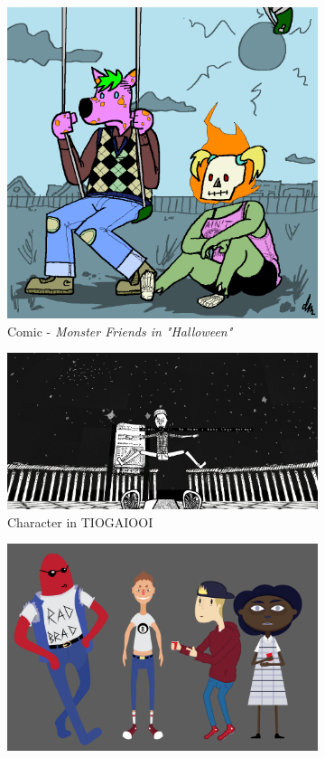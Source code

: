\begin{figure}[H]
\centering %
\begin{subfigure}{.3\textwidth}
\centering
\includegraphics[width=.9\linewidth]{images/ref_IAN01}
 	\caption{Comic - \textit{Monster Friends in "Halloween"}}
\label{fig:i1}
\end{subfigure} %
\begin{subfigure}{.59\textwidth}
\centering
\includegraphics[width=.9\linewidth]{images/ref_MICHAEL03}
\caption{Character in TIOGAIOOI}
\label{fig:m1}
\end{subfigure} %
\begin{subfigure}{.45\textwidth}
  \centering
  \includegraphics[width=.9\linewidth]{images/ref_MICHAEL04}

\end{subfigure}
\end{figure}
